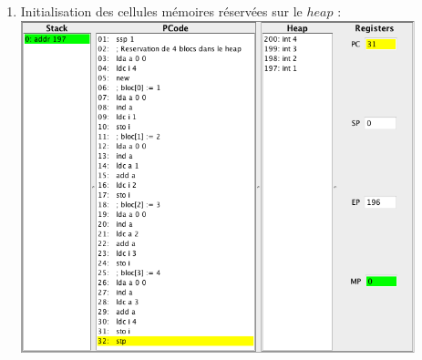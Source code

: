 \documentclass[french,11pt,twoside]{article}
\begin{document}
\begin{enumerate}
\item Initialisation des cellules mémoires réservées sur le $heap$ : \\
            \includegraphics[width=0.9\textwidth]{images/exemple-heap-2} 
\end{enumerate}
\end{document}

